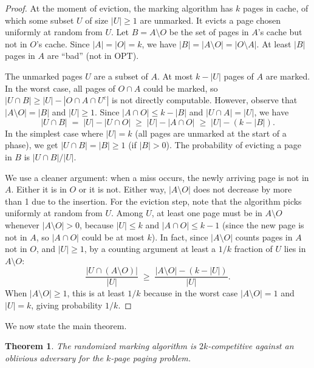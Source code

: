 \documentclass[twoside,12pt]{book}
\theoremstyle{plain}
\newtheorem{theorem}{Theorem}[chapter]
\theoremstyle{definition}
\theoremstyle{remark}
\begin{document}
\begin{proof}
At the moment of eviction, the marking algorithm has $k$ pages in cache,
of which some subset $U$ of size $|U| \ge 1$ are unmarked.  It evicts a
page chosen uniformly at random from $U$.  Let $B = A \setminus O$ be the
set of pages in $A$'s cache but not in $O$'s cache.  Since $|A| = |O| =
k$, we have $|B| = |A \setminus O| = |O \setminus A|$.  At least $|B|$
pages in $A$ are ``bad'' (not in OPT).

The unmarked pages $U$ are a subset of $A$.  At most $k - |U|$ pages of
$A$ are marked.  In the worst case, all pages of $O \cap A$ could be
marked, so $|U \cap B| \ge |U| - |O \cap A \cap U^c|$ is not directly
computable.  However, observe that $|A \setminus O| = |B|$ and $|U|
\ge 1$.  Since $|A \cap O| \le k - |B|$ and $|U \cap A| = |U|$, we
have
\[
  |U \cap B| \;=\; |U| - |U \cap O| \;\ge\; |U| - |A \cap O| \;\ge\; |U| - (k - |B|).
\]
In the simplest case where $|U| = k$ (all pages are unmarked at the
start of a phase), we get $|U \cap B| = |B| \ge 1$ (if $|B| > 0$).
The probability of evicting a page in $B$ is $|U \cap B|/|U|$.

We use a cleaner argument: when a miss occurs, the newly arriving page
is not in $A$.  Either it is in $O$ or it is not.  Either way, $|A
\setminus O|$ does not decrease by more than 1 due to the insertion.
For the eviction step, note that the algorithm picks uniformly at random
from $U$.  Among $U$, at least one page must be in $A \setminus O$
whenever $|A \setminus O| > 0$, because $|U| \le k$ and $|A \cap O| \le
k - 1$ (since the new page is not in $A$, so $|A \cap O|$ could be at
most $k$).  In fact, since $|A \setminus O|$ counts pages in $A$ not in
$O$, and $|U| \ge 1$, by a counting argument at least a $1/k$ fraction
of $U$ lies in $A \setminus O$:
\[
  \frac{|U \cap (A \setminus O)|}{|U|} \;\ge\; \frac{|A \setminus O| - (k - |U|)}{|U|}.
\]
When $|A \setminus O| \ge 1$, this is at least $1/k$ because in the worst
case $|A \setminus O| = 1$ and $|U| = k$, giving probability $1/k$.
\end{proof}

We now state the main theorem.

\begin{theorem}\label{thm:marking-2k}
The randomized marking algorithm is $2k$-competitive against an oblivious
adversary for the $k$-page paging problem.
\end{theorem}
\end{document}

